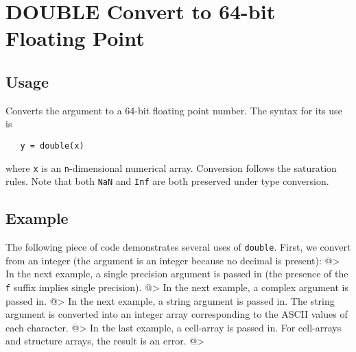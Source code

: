\section{DOUBLE Convert to 64-bit Floating Point}

\subsection{Usage}

Converts the argument to a 64-bit floating point number.  The syntax
for its use is
\begin{verbatim}
   y = double(x)
\end{verbatim}
where \verb|x| is an \verb|n|-dimensional numerical array.  Conversion follows the 
saturation rules.  Note that both \verb|NaN| and \verb|Inf| are both preserved under type conversion.
\subsection{Example}

The following piece of code demonstrates several uses of \verb|double|.  First, 
we convert from an integer (the argument is an integer because no decimal is present):
@>
In the next example, a single precision argument is passed in (the presence of 
the \verb|f| suffix implies single precision).
@>
In the next example, a complex argument is passed in.
@>
In the next example, a string argument is passed in.  The string argument 
is converted into an integer array corresponding to the ASCII values of each character.
@>
In the last example, a cell-array is passed in.  For cell-arrays 
and structure arrays, the result is an error.
@>
